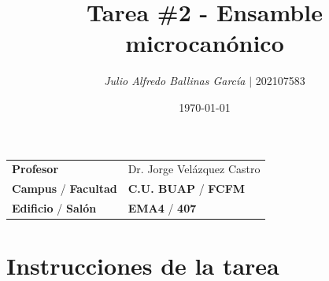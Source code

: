\documentclass{article}
\title{\textcolor{Apple Green}{\textbf{Tarea}} \textcolor{Sun}{\textbf{\#}}\textcolor{Cinnabar}{\textbf{2}} - \textbf{Ensamble microcanónico}}
\author{\emph{Julio Alfredo Ballinas García} $\boldsymbol{\mid}$ 202107583}
\date{\today}
\begin{document}
\maketitle



\begin{mybox}
\noindent\begin{tabular}{@{}ll}
	{\bfseries{Profesor}} & Dr. Jorge Velázquez Castro\\
	\textcolor{prussianblue}{\bfseries{Campus}} / \textcolor{trueblue}{\bfseries{Facultad}}  & \textcolor{prussianblue}{\bfseries{C.U. BUAP}} /  \textcolor{trueblue}{\bfseries{FCFM}} \\
	\textcolor{prussianblue}{\bfseries{Edificio}} /  \textcolor{trueblue}{\bfseries{Salón}}    & 	\textcolor{prussianblue}{\bfseries{EMA4}} /  \textcolor{trueblue}{\bfseries{407}}   
\end{tabular} 
\end{mybox} \vspace{1cm}

\section{Instrucciones de la tarea}
\end{document}
